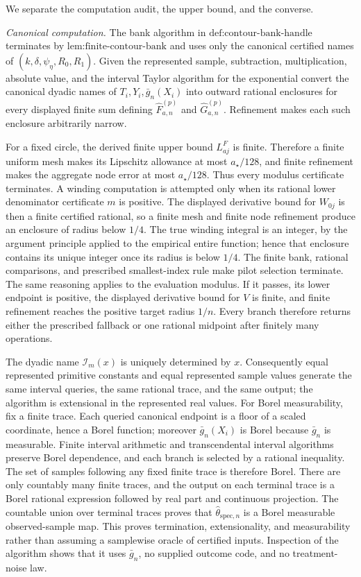 We separate the computation audit, the upper bound, and the converse.

\emph{Canonical computation.}  The bank algorithm in \(\text{def:contour-bank-handle}\) terminates by \(\text{lem:finite-contour-bank}\) and uses only the canonical certified names of \((k,\delta,\psi_{\eta},R_0,R_1)\).  Given the represented sample, subtraction, multiplication, absolute value, and the interval Taylor algorithm for the exponential convert the canonical dyadic names of \(T_i,Y_i,\bar g_n(X_i)\) into outward rational enclosures for every displayed finite sum defining \(\widehat F_{a,n}^{(p)}\) and \(\widehat G_{a,n}^{(p)}\).  Refinement makes each such enclosure arbitrarily narrow.

For a fixed circle, the derived finite upper bound \(L^F_{aj}\) is finite.  Therefore a finite uniform mesh makes its Lipschitz allowance at most \(a_{\star}/128\), and finite refinement makes the aggregate node error at most \(a_{\star}/128\).  Thus every modulus certificate terminates.  A winding computation is attempted only when its rational lower denominator certificate \(m\) is positive.  The displayed derivative bound for \(W_{0j}\) is then a finite certified rational, so a finite mesh and finite node refinement produce an enclosure of radius below \(1/4\).  The true winding integral is an integer, by the argument principle applied to the empirical entire function; hence that enclosure contains its unique integer once its radius is below \(1/4\).  The finite bank, rational comparisons, and prescribed smallest-index rule make pilot selection terminate.  The same reasoning applies to the evaluation modulus.  If it passes, its lower endpoint is positive, the displayed derivative bound for \(V\) is finite, and finite refinement reaches the positive target radius \(1/n\).  Every branch therefore returns either the prescribed fallback or one rational midpoint after finitely many operations.

The dyadic name \(\mathcal I_m(x)\) is uniquely determined by \(x\).  Consequently equal represented primitive constants and equal represented sample values generate the same interval queries, the same rational trace, and the same output; the algorithm is extensional in the represented real values.  For Borel measurability, fix a finite trace.  Each queried canonical endpoint is a floor of a scaled coordinate, hence a Borel function; moreover \(\bar g_n(X_i)\) is Borel because \(\bar g_n\) is measurable.  Finite interval arithmetic and transcendental interval algorithms preserve Borel dependence, and each branch is selected by a rational inequality.  The set of samples following any fixed finite trace is therefore Borel.  There are only countably many finite traces, and the output on each terminal trace is a Borel rational expression followed by real part and continuous projection.  The countable union over terminal traces proves that \(\widehat\theta_{\mathrm{spec},n}\) is a Borel measurable observed-sample map.  This proves termination, extensionality, and measurability rather than assuming a samplewise oracle of certified inputs.  Inspection of the algorithm shows that it uses \(\bar g_n\), no supplied outcome code, and no treatment-noise law.

